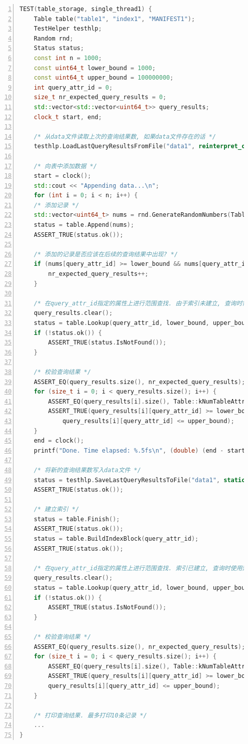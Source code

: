\documentclass[bachelor]{thesis-uestc}
\begin{document}
\begin{lstlisting}[language=C++, basicstyle=\ttfamily\tiny, numbers=left, numberstyle=\tiny, keywordstyle=\color{blue!70}, commentstyle=\color{red!50!green!50!blue!50}, frame=shadowbox, rulesepcolor=\color{red!20!green!20!blue!20}]
TEST(table_storage, single_thread1) {
	Table table("table1", "index1", "MANIFEST1");
	TestHelper testhlp;
	Random rnd;
	Status status;
	const int n = 1000;
	const uint64_t lower_bound = 1000;
	const uint64_t upper_bound = 100000000;
	int query_attr_id = 0;
	size_t nr_expected_query_results = 0;
	std::vector<std::vector<uint64_t>> query_results;
	clock_t start, end;
	
	/* 从data文件读取上次的查询结果数, 如果data文件存在的话 */
	testhlp.LoadLastQueryResultsFromFile("data1", reinterpret_cast<int*>(&nr_expected_query_results));
	
	/* 向表中添加数据 */
	start = clock();
	std::cout << "Appending data...\n";
	for (int i = 0; i < n; i++) {
	/* 添加记录 */
	std::vector<uint64_t> nums = rnd.GenerateRandomNumbers(Table::kNumTableAttributes);
	status = table.Append(nums);
	ASSERT_TRUE(status.ok());
	
	/* 添加的记录是否应该在后续的查询结果中出现? */
	if (nums[query_attr_id] >= lower_bound && nums[query_attr_id] <= upper_bound) {
		nr_expected_query_results++;
	}
	
	/* 在query_attr_id指定的属性上进行范围查找. 由于索引未建立, 查询时需要读取table_file */
	query_results.clear();
	status = table.Lookup(query_attr_id, lower_bound, upper_bound, &query_results);
	if (!status.ok()) {
		ASSERT_TRUE(status.IsNotFound());
	}
	
	/* 校验查询结果 */
	ASSERT_EQ(query_results.size(), nr_expected_query_results);
	for (size_t i = 0; i < query_results.size(); i++) {
		ASSERT_EQ(query_results[i].size(), Table::kNumTableAttributes);
		ASSERT_TRUE(query_results[i][query_attr_id] >= lower_bound &&
			query_results[i][query_attr_id] <= upper_bound);
	}
	end = clock();
	printf("Done. Time elapsed: %.5fs\n", (double) (end - start) / CLOCKS_PER_SEC);
	
	/* 将新的查询结果数写入data文件 */
	status = testhlp.SaveLastQueryResultsToFile("data1", static_cast<int>(nr_expected_query_results));
	ASSERT_TRUE(status.ok());
	
	/* 建立索引 */
	status = table.Finish();
	ASSERT_TRUE(status.ok());
	status = table.BuildIndexBlock(query_attr_id);
	ASSERT_TRUE(status.ok());
	
	/* 在query_attr_id指定的属性上进行范围查找. 索引已建立, 查询时使用索引加速查找 */
	query_results.clear();
	status = table.Lookup(query_attr_id, lower_bound, upper_bound, &query_results);
	if (!status.ok()) {
		ASSERT_TRUE(status.IsNotFound());
	}
	
	/* 校验查询结果 */
	ASSERT_EQ(query_results.size(), nr_expected_query_results);
	for (size_t i = 0; i < query_results.size(); i++) {
		ASSERT_EQ(query_results[i].size(), Table::kNumTableAttributes);
		ASSERT_TRUE(query_results[i][query_attr_id] >= lower_bound &&
		query_results[i][query_attr_id] <= upper_bound);
	}
	
	/* 打印查询结果. 最多打印10条记录 */
	...
}
\end{lstlisting}
\end{document}
